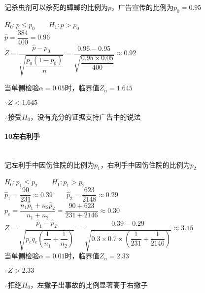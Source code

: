 \documentclass[UTF8]{ctexart}
\begin{document}
记杀虫剂可以杀死的蟑螂的比例为$p$，广告宣传的比例为$p_0=0.95$

$H_0:p\le p_0 \qquad H_1:p > p_0$
~\\

$\hat{p}=\dfrac{384}{400}=0.96$
~\\

$Z=\dfrac{\hat{p}-p_0}{\sqrt{\dfrac{p_0(1-p_0)}{n}}}=\dfrac{0.96-0.95}{\sqrt{\dfrac{0.95\times 0.05}{400}}}\approx0.92$

当单侧检验$\alpha=0.05$时，临界值$Z_\alpha=1.645$

$\because Z < 1.645$

$\therefore$接受$H_0$，没有充分的证据支持广告中的说法

\paragraph{10左右利手}
~\\

记左利手中因伤住院的比例为$p_1$，右利手中因伤住院的比例为$p_2$

$H_0:p_1 \le p_2 \qquad H_1:p_1 > p_2$
~\\

$\hat p_1=\dfrac{90}{231}\approx0.39 \qquad \hat p_2=\dfrac{623}{2148}\approx0.29$
~\\

$p_e=\dfrac{n_1\hat p_1+n_2\hat p_2}{n_1+n_2}=\dfrac{90+623}{231+2146}\approx0.30$
~\\

$Z=\dfrac{\hat p_1 - \hat p_2}{\sqrt{p_eq_e\left(\dfrac{1}{n_1}+\dfrac{1}{n_2}\right)}}=\dfrac{0.39-0.29}{\sqrt{0.3\times0.7\times\left(\dfrac{1}{231}+\dfrac{1}{2146}\right)}}\approx3.15$
~\\

当单侧检验$\alpha=0.01$时，临界值$Z_\alpha=2.33$

$\because Z > 2.33$

$\therefore$拒绝$H_0$，左撇子出事故的比例显著高于右撇子
\end{document}
